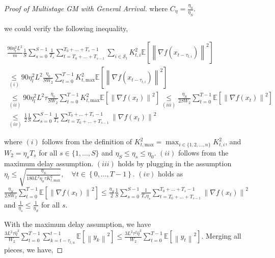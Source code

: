 \begin{proof}[Proof of Multistage GM with General Arrival]
where $C_\eta=\frac{\eta_0}{\eta_S}$.

we could verify the following inequality,

\begin{equation}
\begin{gathered}
\frac{90 \eta_l^2 L^2}{m} \frac{1}{S}\sum_{s=0}^{S-1} \frac{1}{T_s}\sum_{t=T_0+\dots+T_{s-1} }^{T_0+\dots+T_s-1} \sum_{i\in\mathcal{S}_t} K_{t,i}^2\mathbb{E}\left[\left\| \nabla f(x_{t-\tau_{t,i}})\right\|^2\right] \\ 
\underset{(i)}{\leq} 90 \eta_l^2 L^2  \frac{\eta_0}{S W_2} \sum_{t=0}^{T-1} K_{t,\text{max}}^2 \mathbb{E}\left[\left\| \nabla f(x_{t-\tau_{t,i}})\right\|^2\right]\\
\underset{(ii)}{\leq} 90 \eta_l^2 L^2 \tau  \frac{\eta_0}{S W_2} \sum_{t=0}^{T-1} K_{t,\text{max}}^2 \mathbb{E}\left[\left\| \nabla f(x_{t})\right\|^2\right] \underset{(iii)}{\leq} \frac{\eta_S}{2 S W_2} \sum_{t=0}^{T-1} \mathbb{E}\left[\left\| \nabla f(x_{t})\right\|^2\right]\\
\underset{(iv)}{\leq} \frac{1}{2}\frac{1}{S}\sum_{s=0}^{S-1} \frac{1}{T_s}\sum_{t=T_0+\dots+T_{s-1} }^{T_0+\dots+T_s-1} \left\|\nabla f(x_t)\right\|^2
\end{gathered}\nonumber
\end{equation}

where $(i)$ follows from the definition of $K_{t,\text{max}}^2=\max_{i\in\{1,2,\dots,n\}}K_{t,i}^2$, and $W_2=\eta_s T_s$ for all $s\in\{1,\dots,S\}$ and $\eta_S \leq \eta_s \leq \eta_0$. $(ii)$ follows from the maximum delay assumption. $(iii)$ holds by plugging in the assumption $\eta_l \leq \sqrt{\frac{\eta_S}{ 180L^2 \eta_0 \tau K_{t,\text{max}}^2}}, \quad  \forall t \in \left\{0,\dots,T-1\right\}$. $(iv)$ holds as $\frac{\eta_S}{2 S W_2} \sum_{t=0}^{T-1} \mathbb{E}\left[\left\| \nabla f(x_{t})\right\|^2\right] \leq \frac{\eta_S}{2}\frac{1}{S}\sum_{s=0}^{S-1} \frac{1}{T_s \eta_s}\sum_{t=T_0+\dots+T_{s-1} }^{T_0+\dots+T_s-1} \left\|\nabla f(x_t)\right\|^2$ and $\frac{1}{\eta_s}\leq\frac{1}{\eta_S}$ for all $s$.

With the maximum delay assumption, we have $\frac{3 L^2 \tau \hat{\eta}^3}{W_2} \sum_{t=0}^{T-1} \sum_{k=t-\tau_{t,u}}^{t-1}\mathbb{E}\left[\left\|  y_k \right\|^2\right] \leq \frac{3 L^2 \tau^2 \hat{\eta}^3}{W_2} \sum_{t=0}^{T-1} \mathbb{E}\left[\left\|  y_t \right\|^2\right]$. Merging all pieces, we have,


\end{proof}
